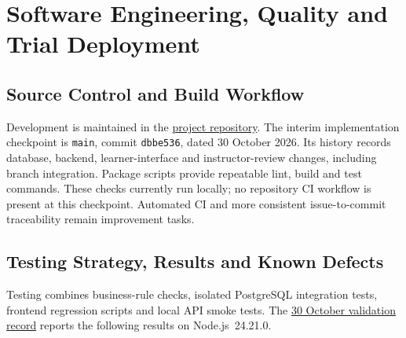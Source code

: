 
\section{Software Engineering, Quality and Trial Deployment}
\label{sec:quality}

\subsection{Source Control and Build Workflow}
Development is maintained in the
\href{https://github.com/huyho44/IELTS-Evaluator-Pro}{project repository}.
The interim implementation checkpoint is \texttt{main}, commit
\texttt{dbbe536}, dated 30 October 2026. Its history records database,
backend, learner-interface and instructor-review changes, including branch
integration. Package scripts provide repeatable lint, build and test commands.
These checks currently run locally; no repository CI workflow is present at
this checkpoint. Automated CI and more consistent issue-to-commit traceability
remain improvement tasks.

\subsection{Testing Strategy, Results and Known Defects}
Testing combines business-rule checks, isolated PostgreSQL integration tests,
frontend regression scripts and local API smoke tests. The
\href{https://github.com/huyho44/IELTS-Evaluator-Pro/blob/dbbe536/docs/validation/MVP-checks-2026-10-30.md}{30 October validation record}
reports the following results on Node.js~24.21.0.

